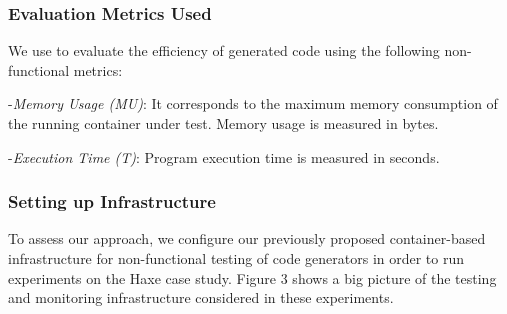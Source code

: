 \subsubsection{Evaluation Metrics Used}
We use to evaluate the efficiency of generated code using the following non-functional metrics:

-\textit{Memory Usage (MU)}:
It corresponds to the maximum memory consumption of the running container under test. Memory usage is measured in bytes.

-\textit{Execution Time (T)}:
Program execution time is measured in seconds.
 
\subsubsection{Setting up Infrastructure}
To assess our approach, we configure our previously proposed container-based infrastructure for non-functional testing of code generators in order to run experiments on the Haxe case study.
Figure 3 shows a big picture of the testing and monitoring infrastructure considered in these experiments.
